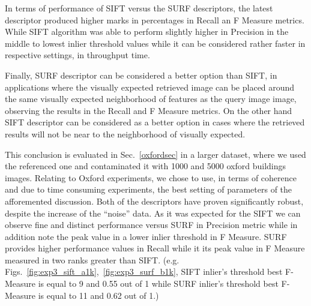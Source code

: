 

In terms of performance of SIFT versus the SURF descriptors, the latest descriptor produced higher marks in percentages in Recall an F Measure metrics. While SIFT algorithm was able to perform slightly higher in Precision in the middle to lowest inlier threshold values while it can be considered rather faster in respective settings, in throughput time.
  
Finally, SURF descriptor can be considered a better option than SIFT, in applications where the visually expected retrieved image can be placed around the same visually expected neighborhood of features as the query image image, observing the results
in the Recall and F Measure metrics.
On the other hand SIFT descriptor can be considered as a better option in cases where
the retrieved results will not be near to the neighborhood of visually expected.

This conclusion is evaluated in Sec.~\ref{oxfordsec} in a larger dataset, where we used the referenced one and contaminated it with 1000 and 5000 oxford buildings images.
Relating to Oxford experiments, we chose to use, in terms of coherence and due to time consuming experiments, the best setting of parameters of the afforemented discussion.
Both of the descriptors have proven significantly robust, despite the increase of the ``noise'' data. As it was expected for the SIFT we can observe fine and distinct performance versus SURF in Precision metric while in addition note the peak value in a lower inlier threshold in F Measure.
SURF provides higher performance values in Recall while it its peak value in F Measure measured in two ranks greater than SIFT. (e.g. Figs.~\ref{fig:exp3_sift_a1k},~\ref{fig:exp3_surf_b1k}, SIFT inlier's threshold best F-Measure is equal to 9 and 0.55 out of 1 while SURF inlier's threshold best F-Measure is equal to 11 and 0.62 out of 1.)

